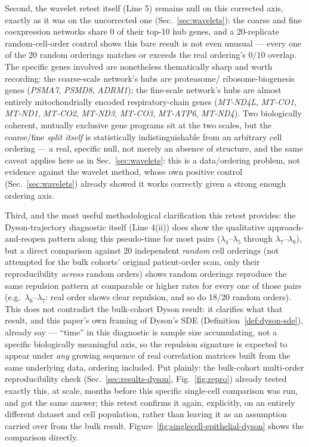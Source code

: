 \documentclass[11pt]{article}
\begin{document}
Second, the wavelet retest itself (Line 5) remains null on
this corrected axis, exactly as it was on the uncorrected one
(Sec.~\ref{sec:wavelets}): the coarse and fine coexpression networks
share $0$ of their top-10 hub genes, and a 20-replicate random-cell-order
control shows this bare result is not even unusual --- every one of the
20 random orderings matches or exceeds the real ordering's $0/10$
overlap. The specific genes involved are nonetheless thematically sharp
and worth recording: the coarse-scale network's hubs are proteasome/
ribosome-biogenesis genes (\emph{PSMA7}, \emph{PSMD8}, \emph{ADRM1});
the fine-scale network's hubs are almost entirely mitochondrially
encoded respiratory-chain genes (\emph{MT-ND4L}, \emph{MT-CO1},
\emph{MT-ND1}, \emph{MT-CO2}, \emph{MT-ND3}, \emph{MT-CO3},
\emph{MT-ATP6}, \emph{MT-ND4}). Two biologically coherent, mutually
exclusive gene programs sit at the two scales, but the coarse/fine
\emph{split itself} is statistically indistinguishable from an
arbitrary cell ordering --- a real, specific null, not merely an
absence of structure, and the same caveat applies here as in
Sec.~\ref{sec:wavelets}: this is a data/ordering problem, not evidence
against the wavelet method, whose own positive control
(Sec.~\ref{sec:wavelets}) already showed it works correctly given a
strong enough ordering axis.

Third, and the most useful methodological clarification this retest
provides: the Dyson-trajectory diagnostic itself (Line 4(ii)) does show
the qualitative approach-and-reopen pattern along this pseudo-time for
most pairs ($\lambda_4$--$\lambda_5$ through $\lambda_7$--$\lambda_8$),
but a direct comparison against 20 independent \emph{random} cell
orderings (not attempted for the bulk cohorts' original patient-order
scan, only their reproducibility \emph{across} random orders) shows
random orderings reproduce the same repulsion pattern at comparable or
higher rates for every one of those pairs (e.g.\
$\lambda_6$--$\lambda_7$: real order shows clear repulsion, and so do
18/20 random orders). This does not contradict the bulk-cohort Dyson
result: it clarifies what that result, and this paper's own framing of
Dyson's SDE (Definition~\ref{def:dyson-sde}), already say --- ``time''
in this diagnostic is sample size accumulating, not a specific
biologically meaningful axis, so the repulsion signature is expected to
appear under \emph{any} growing sequence of real correlation matrices
built from the same underlying data, ordering included. Put plainly:
the bulk-cohort multi-order reproducibility check
(Sec.~\ref{sec:results-dyson}, Fig.~\ref{fig:repro}) already tested
exactly this, at scale, months before this specific single-cell
comparison was run, and got the same answer; this retest confirms it
again, explicitly, on an entirely different dataset and cell population,
rather than leaving it as an assumption carried over from the bulk
result. Figure~\ref{fig:singlecell-epithelial-dyson} shows the
comparison directly.
\end{document}
